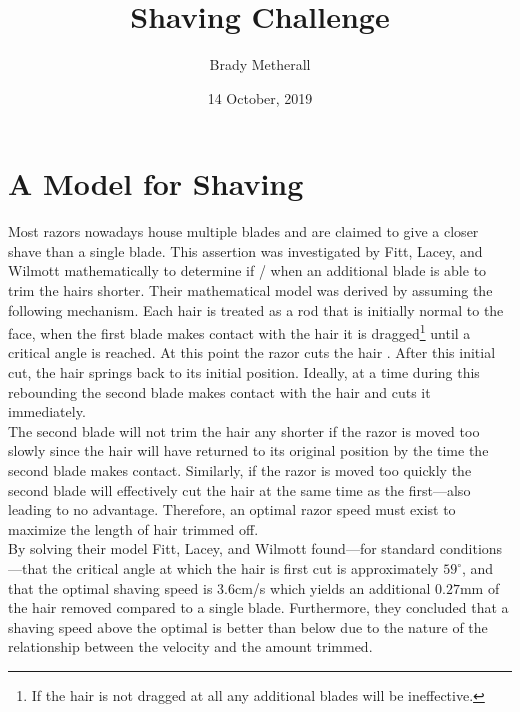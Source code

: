 \documentclass[11pt,a4paper]{article}
\title{Shaving Challenge}
\author{Brady Metherall}
\date{14 October, 2019}
\begin{document}
\maketitle

\section{A Model for Shaving}
Most razors nowadays house multiple blades and are claimed to give a closer shave than a single blade. This assertion was investigated by Fitt, Lacey, and Wilmott \cite{fitt} mathematically to determine if / when an additional blade is able to trim the hairs shorter. Their mathematical model was derived by assuming the following mechanism. Each hair is treated as a rod that is initially normal to the face, when the first blade makes contact with the hair it is dragged\footnote{If the hair is not dragged at all any additional blades will be ineffective.} until a critical angle is reached. At this point the razor cuts the hair \cite{fitt}. After this initial cut, the hair springs back to its initial position. Ideally, at a time during this rebounding the second blade makes contact with the hair and cuts it immediately. \\

The second blade will not trim the hair any shorter if the razor is moved too slowly since the hair will have returned to its original position by the time the second blade makes contact. Similarly, if the razor is moved too quickly the second blade will effectively cut the hair at the same time as the first---also leading to no advantage. Therefore, an optimal razor speed must exist to maximize the length of hair trimmed off. \\

By solving their model Fitt, Lacey, and Wilmott found---for standard conditions---that the critical angle at which the hair is first cut is approximately $59^\circ$, and that the optimal shaving speed is $3.6$cm/s which yields an additional $0.27$mm of the hair removed compared to a single blade. Furthermore, they concluded that a shaving speed above the optimal is better than below due to the nature of the relationship between the velocity and the amount trimmed.
\end{document}
